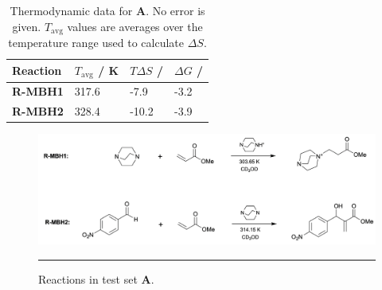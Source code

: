 \documentclass[../main.tex]{subfiles}
\begin{document}
\begin{table}[h!]
	\renewcommand{\arraystretch}{1.5}
	\begin{center}
		\small
		\begin{tabularx}{\textwidth}{YYYY} 
			\toprule
			Reaction & $T_\text{avg}$ / K & {$T\Delta S$} / \kcal & {$\Delta G$} / \kcal \\
			\hline
			\bfseries{R-MBH1}       & 317.6  & -7.9 & -3.2\\
			\bfseries{R-MBH2}       & 328.4  & -10.2 & -3.9\\
			\bottomrule
		\end{tabularx}
	\end{center}
	
	\caption{Thermodynamic data for {\bfseries{A}}. No error is given. $T_\text{avg}$ values are averages over the temperature range used to calculate $\Delta S$.}
	\label{setA_data}
\end{table}

\begin{figure}[h!]
	\centering
	\includegraphics[width=13cm]{8/figs/plata_mbh}
	\vspace{0.2cm}
	\hrule
	\caption{Reactions in test set {\bfseries{A}}. }
	\label{plata_mbh}
\end{figure}
\end{document}

